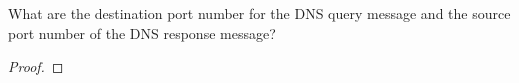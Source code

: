 \documentclass[../../main.tex]{subfiles}
\begin{document}
\begin{wts}
What are the destination port number for the DNS query message and the source port number of the DNS response message?
\end{wts}
\begin{proof}

\end{proof}
\end{document}
